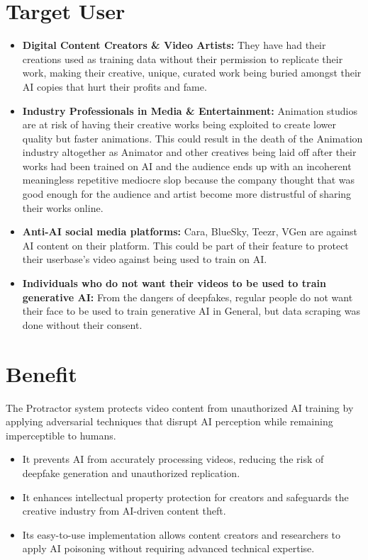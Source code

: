 \section{Target User}
\label{section:target-user}

\begin{itemize}
    \item \textbf{Digital Content Creators \& Video Artists:} They have had their creations used as training data without their permission to replicate their work, making their creative, unique, curated work being buried amongst their AI copies that hurt their profits and fame.
    \item \textbf{Industry Professionals in Media \& Entertainment:} Animation studios are at risk of having their creative works being exploited to create lower quality but faster animations. This could result in the death of the Animation industry altogether as Animator and other creatives being laid off after their works had been trained on AI and the audience ends up with an incoherent meaningless repetitive mediocre slop because the company thought that was good enough for the audience and artist become more distrustful of sharing their works online.

    \item \textbf{Anti-AI social media platforms:} Cara, BlueSky, Teezr, VGen are against AI content on their platform. This could be part of their feature to protect their userbase’s video against being used to train on AI.
    \item \textbf{Individuals who do not want their videos to be used to train generative AI:} From the dangers of deepfakes, regular people do not want their face to be used to train generative AI in General, but data scraping was done without their consent.
\end{itemize}

\section{Benefit}
\label{section:benefit}

The Protractor system protects video content from unauthorized AI training by applying adversarial techniques that disrupt AI perception while remaining imperceptible to humans.

\begin{itemize}
    \item It prevents AI from accurately processing videos, reducing the risk of deepfake generation and unauthorized replication. 
    \item It enhances intellectual property protection for creators and safeguards the creative industry from AI-driven content theft.
    \item Its easy-to-use implementation allows content creators and researchers to apply AI poisoning without requiring advanced technical expertise.
\end{itemize}

